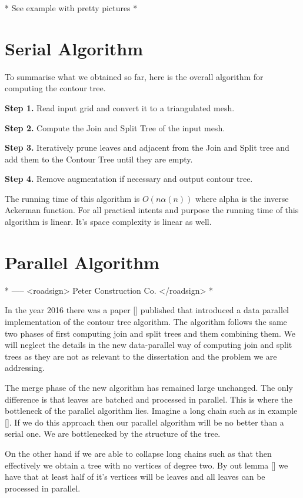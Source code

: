 * See example with pretty pictures *

\section{Serial Algorithm}

To summarise what we obtained so far, here is the overall algorithm for computing the contour tree.

\textbf{Step 1.} Read input grid and convert it to a triangulated mesh.

\textbf{Step 2.} Compute the Join and Split Tree of the input mesh.

\textbf{Step 3.} Iteratively prune leaves and adjacent from the Join and Split tree and add them to the Contour Tree until they are empty.

\textbf{Step 4.} Remove augmentation if necessary and output contour tree.

The running time of this algorithm is $O(n\alpha(n))$ where alpha is the inverse Ackerman function. For all practical intents and purpose the running time of this algorithm is linear. It's space complexity is linear as well.

\section{Parallel Algorithm}

* ----- <roadsign> Peter Construction Co. </roadsign> *


In the year 2016 there was a paper [] published that introduced a data parallel implementation of the contour tree algorithm. The algorithm follows the same two phases of first computing join and split trees and them combining them. We will neglect the details in the new data-parallel way of computing join and split trees as they are not as relevant to the dissertation and the problem we are addressing.  


The merge phase of the new algorithm has remained large unchanged. The only difference is that leaves are batched and processed in parallel. This is where the bottleneck of the parallel algorithm lies. Imagine a long chain such as in example []. If we do this approach then our parallel algorithm will be no better than a serial one. We are bottlenecked by the structure of the tree. 

On the other hand if we are able to collapse long chains such as that then effectively we obtain a tree with no vertices of degree two. By out lemma [] we have that at least half of it's vertices will be leaves and all leaves can be processed in parallel.

